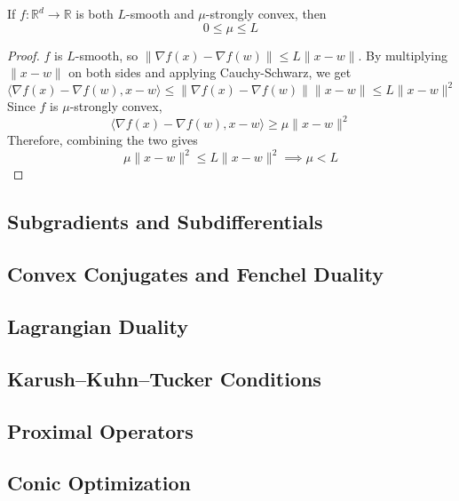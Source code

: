 	\begin{lemma}
	  If $f: \mathbb{R}^d \to \mathbb{R}$ is both $L$-smooth and $\mu$-strongly convex, then 
		\begin{equation}
		  0 \leq \mu \leq L
		\end{equation}
	\end{lemma}
	\begin{proof}
	  $f$ is $L$-smooth, so $\|\nabla f(x) - \nabla f(w) \| \leq L \|x - w\|$. By multiplying $\|x - w\|$ on both sides and applying Cauchy-Schwarz, we get 
		\begin{equation}
		  \langle \nabla f(x) - \nabla f(w), x - w \rangle \leq \| \nabla f(x) - \nabla f(w)\| \|x - w\| \leq L\|x - w\|^2 
		\end{equation}
		Since $f$ is $\mu$-strongly convex, 
		\begin{equation}
		  \langle \nabla f(x) - \nabla f(w), x - w \rangle  \geq \mu \|x - w\|^2 
		\end{equation}
		Therefore, combining the two gives 
		\begin{equation}
		  \mu\|x - w\|^2 \leq L \|x - w\|^2 \implies \mu < L
		\end{equation}
	\end{proof}

\subsection{Subgradients and Subdifferentials} 

\subsection{Convex Conjugates and Fenchel Duality}

\subsection{Lagrangian Duality}

\subsection{Karush--Kuhn--Tucker Conditions}

\subsection{Proximal Operators}

\subsection{Conic Optimization}
